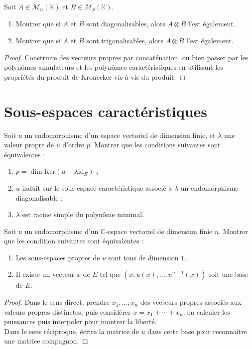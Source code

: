 \documentclass[french,a4paper]{article}
\newcommand{\C}{\mathbb{C}}
\newcommand{\K}{\mathbb{K}}
\renewcommand{\ker}{\text{Ker}}
\theoremstyle{plain}
\theoremstyle{definition}
\theoremstyle{remark}
\begin{document}
\begin{ex}{}
	Soit $A\in\mathcal{M}_n(\K)$ et $B\in\mathcal{M}_p(\K)$. 
	\begin{enumerate}
		\item Montrer que si $A$ et $B$ sont diagonalisables, alors $A\otimes B$ l'est également.
		\item Montrer que si $A$ et $B$ sont trigonalisables, alors $A\otimes B$ l'est également.
	\end{enumerate}
\end{ex}
\begin{proof}
	Construire des vecteurs propres par concaténation, ou bien passer par les polynômes annulateurs et les polynômes caractéristiques en utilisant les propriétés du produit de Kronecker vis-à-vis du produit.
\end{proof}

\section{Sous-espaces caractéristiques}

\begin{ex}{}
	Soit $u$ un endomorphisme d'un espace vectoriel de dimension finie, et $\lambda$ une valeur propre de $u$ d'ordre $p$. Montrer que les conditions suivantes sont équivalentes :
	\begin{enumerate}[label=(\roman*)]
		\item $p=\dim\ker(u-\lambda\text{id}_E)$ ;
		\item $u$ induit sur le sous-espace caractéristique associé à $\lambda$ un endomorphisme diagonalisable ;
		\item $\lambda$ est racine simple du polynôme minimal.
	\end{enumerate}
\end{ex}

\begin{ex}{}
	Soit $u$ un endomorphisme d'un $\C$-espace vectoriel de dimension finie $n$. Montrer que les condition suivantes sont équivalentes :
	\begin{enumerate}[label=(\roman*)]
		\item Les sous-espaces propres de $u$ sont tous de dimension $1$.
		\item Il existe un vecteur $x$ de $E$ tel que $(x,u(x),\ldots,u^{n-1}(x))$ soit une base de $E$.
	\end{enumerate}
\end{ex}
\begin{proof}
	Dans le sens direct, prendre $x_1,\ldots,x_n$ des vecteurs propres associés aux valeurs propres distinctes, puis considérer $x=x_1+\cdots+x_n$, en calculer les puissances puis interpoler pour montrer la liberté. \\
	Dans le sens réciproque, écrire la matrice de $u$ dans cette base pour reconnaître une matrice compagnon.
\end{proof}
\end{document}
